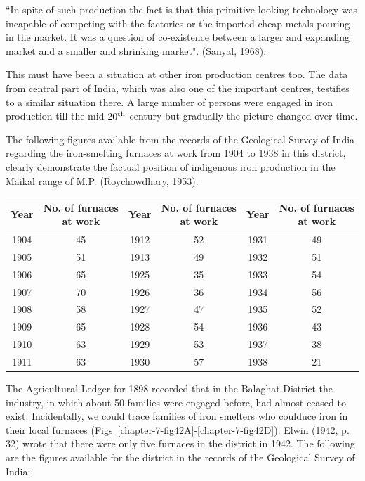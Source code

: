 {\footnotesize{“In spite of such production the fact is that this primitive looking technology was incapable of competing with the factories or the imported cheap metals pouring in the market.  It was a question of co-existence between a larger and expanding market and a smaller and shrinking market".}} (Sanyal, 1968). 

This must have been a situation at other iron production centres too.  The data from central part of India, which was also one of the important centres, testifies to a similar situation there. A large number of persons were engaged in iron production till the mid $20^{\rm th}$ century but gradually the picture changed over time.

The following figures available from the records of the Geological Survey of India regarding the iron-smelting furnaces at work from 1904 to 1938 in this district, clearly demonstrate the factual position of indigenous iron production in the Maikal range of M.P. (Roychowdhary, 1953).

{\fontsize{7}{9}\selectfont\begin{longtable}{|c|c|c|c|c|c|}
\hline
\multicolumn{1}{|m{.5cm}|}{\textbf{Year}} & \multicolumn{1}{m{1.5cm}|}{\centering \textbf{No. of furnaces at work}} & 
\multicolumn{1}{m{.5cm}|}{\textbf{Year}} & \multicolumn{1}{m{1.5cm}|}{\centering \textbf{No. of furnaces at work}} & 
\multicolumn{1}{m{.5cm}|}{\textbf{Year}} & \multicolumn{1}{m{1.5cm}|}{\centering \textbf{No. of furnaces at work}}\\
\hline
1904 & 45 & 1912 & 52 & 1931 & 49\\
1905 & 51 & 1913 & 49 & 1932 & 51\\
1906 & 65 & 1925 & 35 & 1933 & 54\\
1907 & 70 & 1926 & 36 & 1934 & 56\\
1908 & 58 & 1927 & 47 & 1935 & 52\\
1909 & 65 & 1928 & 54 & 1936 & 43\\
1910 & 63 & 1929 & 53 & 1937 & 38\\
1911 & 63 & 1930 & 57 & 1938 & 21\\
\hline
\end{longtable}}

\newpage

The Agricultural Ledger for 1898 recorded that in the Balaghat District the industry, in which about 50 families were engaged before, had almost ceased to exist. Incidentally, we could trace families of iron smelters who coulduce iron in their local furnaces (Figs~\ref{chapter-7-fig42A}-\ref{chapter-7-fig42D}). Elwin (1942, p. 32) wrote that there were only five furnaces in the district in 1942.  The following are the figures available for the district in the records of the Geological Survey of India:


